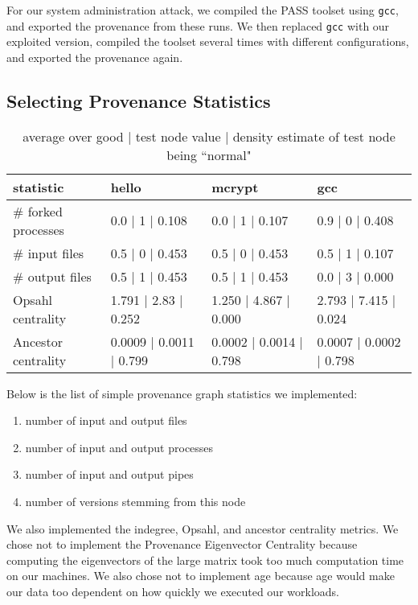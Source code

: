 \documentclass[10pt,twocolumn]{article}
\begin{document}
For our system administration attack, we compiled the PASS toolset using \texttt{gcc}, and exported the provenance from these runs. We then replaced \texttt{gcc} with our exploited version, compiled the toolset several times with different configurations, and exported the provenance again.

\subsection{Selecting Provenance Statistics}

\begin{table*}[ht]
\label{results}
{\small
  \begin{center}
  \begin{tabular}{| l | l | l | l |}
    \hline
    statistic & hello & mcrypt & gcc \\ \hline
     \# forked processes & 0.0 | 1 | 0.108 & 0.0 | 1 | 0.107 & 0.9 | 0 | 0.408 \\ \hline
     \# input files & 0.5 | 0 | 0.453 & 0.5 | 0 | 0.453 & 0.5 | 1 | 0.107 \\ \hline
     \# output files & 0.5 | 1 | 0.453 & 0.5 | 1 | 0.453 & 0.0 | 3 | 0.000 \\ \hline
    Opsahl centrality & 1.791 | 2.83 | 0.252 & 1.250 | 4.867 | 0.000 & 2.793 | 7.415 | 0.024 \\ \hline
    Ancestor centrality & 0.0009 | 0.0011 | 0.799 & 0.0002 | 0.0014 | 0.798 & 0.0007 | 0.0002 | 0.798 \\

    \hline
  \end{tabular}
  \end{center}
}
\hfill{}
\caption{average over good | test node value | density estimate of test node being ``normal"
}
\label{tb:tablename}
\end{table*}

Below is the list of simple provenance graph statistics we implemented:
\begin{enumerate}
\item number of input and output files
\item number of input and output processes
\item number of input and output pipes
\item number of versions stemming from this node
\end{enumerate}
We also implemented the indegree, Opsahl, and ancestor centrality metrics.
We chose not to implement the Provenance Eigenvector Centrality because computing
the eigenvectors of the large matrix took too much computation time on our machines.
We also chose not to implement age because age would make our data too dependent
on how quickly we executed our workloads.
\end{document}

